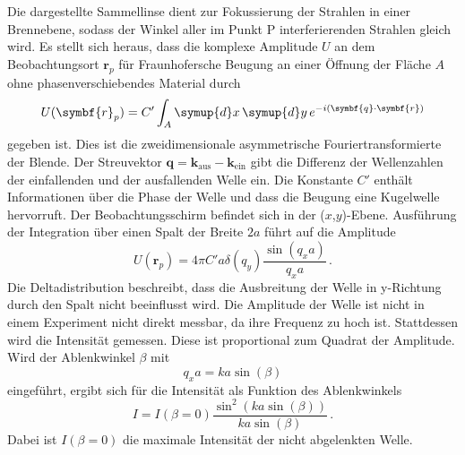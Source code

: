 Die dargestellte Sammellinse dient zur Fokussierung der Strahlen in einer Brennebene,
sodass der Winkel aller im Punkt P interferierenden Strahlen gleich wird.
Es stellt sich heraus, dass die komplexe Amplitude $U$ an dem Beobachtungsort
$\symbf{r}_p$ für Fraunhofersche Beugung an einer Öffnung der Fläche $A$
ohne phasenverschiebendes Material durch
\begin{equation}
  U(\symbf{r}_p) = C' \int_{A} \symup{d}x \, \symup{d}y \, e^{-i(\symbf{q} \cdot \symbf{r})}
  \label{eqn:beugungsintegral}
\end{equation}
gegeben ist. Dies ist die zweidimensionale asymmetrische Fouriertransformierte der
Blende. Der Streuvektor $\symbf{q} = {\symbf{k}}_\text{aus} - {\symbf{k}}_\text{ein}$
gibt die Differenz der Wellenzahlen der einfallenden und der ausfallenden Welle ein.
Die Konstante $C'$ enthält Informationen über die Phase der Welle und dass die Beugung
eine Kugelwelle hervorruft. Der Beobachtungsschirm befindet sich in der ($x$,$y$)-Ebene.
Ausführung der Integration über einen Spalt der Breite $2a$ führt auf die Amplitude
\begin{equation}
  U(\symbf{r}_p) = 4 \pi C' a \delta(q_y) \frac{\sin(q_x a)}{q_x a}\,.
\end{equation}
Die Deltadistribution beschreibt, dass die Ausbreitung der Welle in y-Richtung durch den
Spalt nicht beeinflusst wird. Die Amplitude der Welle ist nicht in einem Experiment nicht
direkt messbar, da ihre Frequenz zu hoch ist. Stattdessen wird die Intensität gemessen.
Diese ist proportional zum Quadrat der Amplitude. Wird der Ablenkwinkel $\beta$ mit
\begin{equation*}
  q_x a = k a \sin(\beta)
\end{equation*}
eingeführt, ergibt sich für die Intensität als Funktion des Ablenkwinkels
\begin{equation}
  I = I(\beta = 0) \frac{\sin^2(k a \sin(\beta))}{k a \sin(\beta)}\,.
\end{equation}
Dabei ist $I(\beta = 0)$ die maximale Intensität der nicht abgelenkten Welle.
